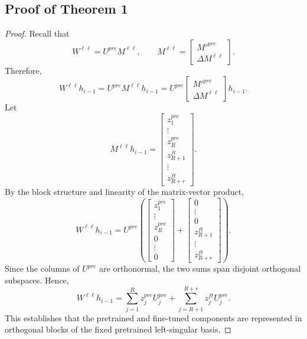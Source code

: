 \subsection{Proof of Theorem 1}
\label{app:proof-linlora-retention}

\begin{proof}
Recall that
\[
W^{\ell \ell}
=
U^{pre}M^{\ell \ell},
\qquad
M^{\ell \ell}
=
\begin{bmatrix}
M'^{pre} \\
\Delta M^{\ell \ell}
\end{bmatrix}.
\]
Therefore,
\[
W^{\ell \ell}h_{i-1}
=
U^{pre}M^{\ell \ell}h_{i-1}
=
U^{pre}
\begin{bmatrix}
M'^{pre} \\
\Delta M^{\ell \ell}
\end{bmatrix}
h_{i-1}.
\]
Let
\[
M^{\ell \ell}h_{i-1}
=
\begin{bmatrix}
z^{pre}_1 \\
\vdots \\
z^{pre}_R \\
z^{ft}_{R+1} \\
\vdots \\
z^{ft}_{R+r}
\end{bmatrix}.
\]
By the block structure and linearity of the matrix-vector product,
\[
W^{\ell \ell}h_{i-1}
=
U^{pre}
\left(
\begin{bmatrix}
z^{pre}_1 \\
\vdots \\
z^{pre}_R \\
0 \\
\vdots \\
0
\end{bmatrix}
+
\begin{bmatrix}
0 \\
\vdots \\
0 \\
z^{ft}_{R+1} \\
\vdots \\
z^{ft}_{R+r}
\end{bmatrix}
\right).
\]
Since the columns of $U^{pre}$ are orthonormal, the two sums span disjoint
orthogonal subspaces. Hence,
\[
W^{\ell \ell}h_{i-1}
=
\sum\limits_{j=1}^{R} z^{pre}_j U^{pre}_j
+
\sum\limits_{j=R+1}^{R+r} z^{ft}_j U^{pre}_j .
\]
This establishes that the pretrained and fine-tuned components are represented
in orthogonal blocks of the fixed pretrained left-singular basis.
\end{proof}


